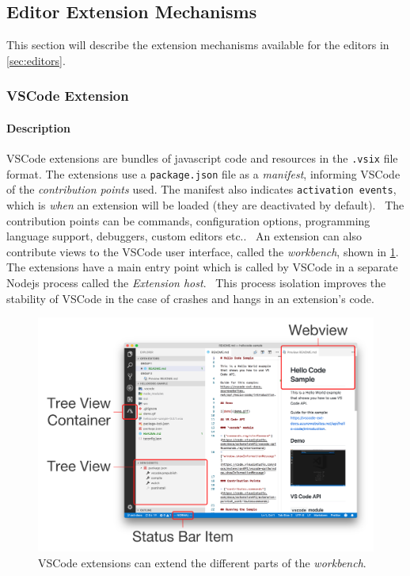 \subsection{Editor Extension Mechanisms}

This section will describe the extension mechanisms available for the editors in \cref{sec:editors}.

\subsubsection{VSCode Extension}\label{chap:vscode-extension}

\paragraph*{Description}
\Gls{VSCode} extensions are bundles of javascript code and resources in the \texttt{.vsix} file format.
The extensions use a \texttt{package.json} file as a \emph{manifest}, informing VSCode of the \emph{contribution points} used. 
The manifest also indicates \texttt{activation events}, which is \textit{when} an extension will be loaded (they are deactivated by default).~\cite{microsoftExtensionAnatomy2020}
The contribution points can be commands, configuration options, programming language support, debuggers, custom editors etc..~\cite{microsoftContributionPoints2020}
An extension can also contribute views to the VSCode user interface, called the \emph{workbench}, shown in \cref{fig:vscode-workbench-extension}.~\cite{microsoftExtendingWorkbench2020}
The extensions have a main entry point which is called by VSCode in a separate \gls{Nodejs} process called the \emph{Extension host}.~\cite{microsoftExtensionHost2020}
This process isolation improves the stability of VSCode in the case of crashes and hangs in an extension's code.\cite{microsoftExtensionsCapabilitiesOverview2020}

\begin{figure}[htbp]
  \centering
  \includegraphics[width=.5\textwidth]{figures/vscode-workbench-contribution.png}
  \caption[VSCode Workbench Extension]{VSCode extensions can extend the different parts of the \emph{workbench}.~\cite{microsoftExtendingWorkbench2020}}\label{fig:vscode-workbench-extension}
\end{figure}

